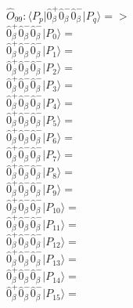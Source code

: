\documentclass[14pt]{article}
\begin{document}
    $\hat{O}_{99}:  \langle{P_p}\vert \hat{0}_{\beta}^{+}\hat{0}_{\beta}^{-}\hat{0}_{\beta}^{-} \vert{P_q}\rangle => $ \\ 
    $ \hat{0}_{\beta}^{+}\hat{0}_{\beta}^{-}\hat{0}_{\beta}^{-} \vert{P_{0}}\rangle =  $ \\ 
    $ \hat{0}_{\beta}^{+}\hat{0}_{\beta}^{-}\hat{0}_{\beta}^{-} \vert{P_{1}}\rangle =  $ \\ 
    $ \hat{0}_{\beta}^{+}\hat{0}_{\beta}^{-}\hat{0}_{\beta}^{-} \vert{P_{2}}\rangle =  $ \\ 
    $ \hat{0}_{\beta}^{+}\hat{0}_{\beta}^{-}\hat{0}_{\beta}^{-} \vert{P_{3}}\rangle =  $ \\ 
    $ \hat{0}_{\beta}^{+}\hat{0}_{\beta}^{-}\hat{0}_{\beta}^{-} \vert{P_{4}}\rangle =  $ \\ 
    $ \hat{0}_{\beta}^{+}\hat{0}_{\beta}^{-}\hat{0}_{\beta}^{-} \vert{P_{5}}\rangle =  $ \\ 
    $ \hat{0}_{\beta}^{+}\hat{0}_{\beta}^{-}\hat{0}_{\beta}^{-} \vert{P_{6}}\rangle =  $ \\ 
    $ \hat{0}_{\beta}^{+}\hat{0}_{\beta}^{-}\hat{0}_{\beta}^{-} \vert{P_{7}}\rangle =  $ \\ 
    $ \hat{0}_{\beta}^{+}\hat{0}_{\beta}^{-}\hat{0}_{\beta}^{-} \vert{P_{8}}\rangle =  $ \\ 
    $ \hat{0}_{\beta}^{+}\hat{0}_{\beta}^{-}\hat{0}_{\beta}^{-} \vert{P_{9}}\rangle =  $ \\ 
    $ \hat{0}_{\beta}^{+}\hat{0}_{\beta}^{-}\hat{0}_{\beta}^{-} \vert{P_{10}}\rangle =  $ \\ 
    $ \hat{0}_{\beta}^{+}\hat{0}_{\beta}^{-}\hat{0}_{\beta}^{-} \vert{P_{11}}\rangle =  $ \\ 
    $ \hat{0}_{\beta}^{+}\hat{0}_{\beta}^{-}\hat{0}_{\beta}^{-} \vert{P_{12}}\rangle =  $ \\ 
    $ \hat{0}_{\beta}^{+}\hat{0}_{\beta}^{-}\hat{0}_{\beta}^{-} \vert{P_{13}}\rangle =  $ \\ 
    $ \hat{0}_{\beta}^{+}\hat{0}_{\beta}^{-}\hat{0}_{\beta}^{-} \vert{P_{14}}\rangle =  $ \\ 
    $ \hat{0}_{\beta}^{+}\hat{0}_{\beta}^{-}\hat{0}_{\beta}^{-} \vert{P_{15}}\rangle =  $ \\ 
    
\end{document}
